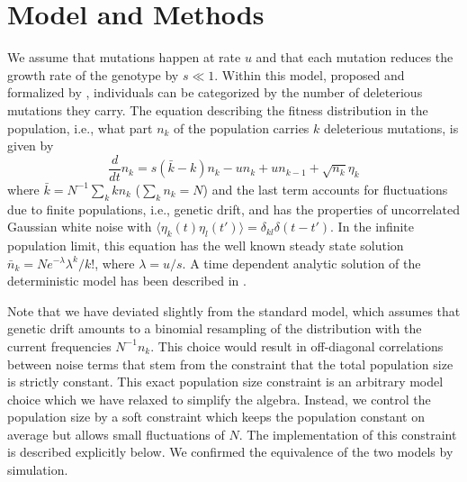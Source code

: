 \documentclass[rmp,preprint]{revtex4}
\newcommand{\n}{n}
\newcommand{\ns}{\bar{\n}}
\newcommand{\mut}{u}
\newcommand{\la}{\langle}
\newcommand{\ra}{\rangle}
\begin{document}
\section{Model and Methods}
We assume that mutations happen at rate $\mut$ and that each mutation reduces the growth rate of the genotype by $s\ll 1$. Within this model, proposed and formalized by \citeauthor{Haigh:1978p37141}, individuals can be categorized by the number of deleterious mutations they carry. The equation describing the fitness distribution in the population, i.e., what part $\n_k$ of the population carries $k$ deleterious mutations, is given by
\begin{equation}
\label{eq:model}
\frac{d}{d t}  \n_k= s(\bar{k}-k)\n_k-\mut\n_k + \mut\n_{k-1} + \sqrt{\n_k}\eta_k
\end{equation}
where $\bar{k} = N^{-1}\sum_k k \n_k$ ($\sum_k \n_k=N$) and the last term accounts for fluctuations due to finite populations, i.e., genetic drift, and has the properties of uncorrelated Gaussian white noise with $\la \eta_k(t)\eta_l(t')\ra = \delta_{kl}\delta(t-t')$. In the infinite population limit, this equation has the well known steady state solution $\ns_k = Ne^{-\lambda} \lambda^k/k!$, where $\lambda = \mut/s$. A time dependent analytic solution of the deterministic model has been described in \citep{Etheridge:2007p44291}.

Note that we have deviated slightly from the standard model, which assumes that genetic drift amounts to a binomial resampling of the distribution with the current frequencies $N^{-1}\n_k$. This choice would result in off-diagonal correlations between noise terms that stem from the constraint that the total population size is strictly constant. This exact population size constraint is an arbitrary model choice which we have relaxed to simplify the algebra. Instead, we control the population size by a soft constraint which keeps the population constant on average but allows small fluctuations of $N$. The implementation of this constraint is described explicitly below. We confirmed the equivalence of the two models by simulation.
\end{document}

